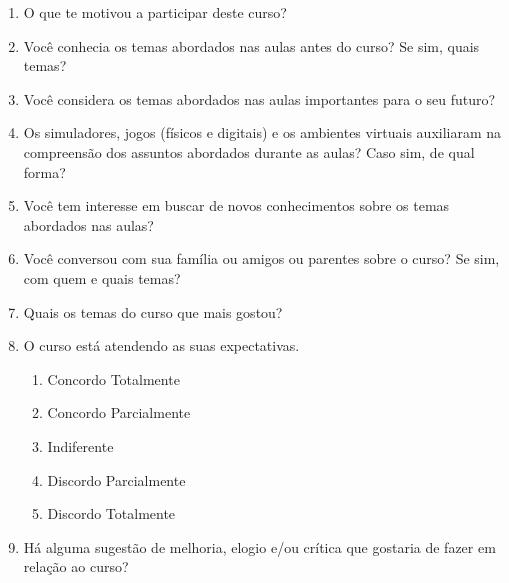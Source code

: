 \begin{enumerate}
    \item O que te motivou a participar deste curso?
    
    \item Você conhecia os temas abordados nas aulas antes do curso? Se sim, quais temas?
    
    \item Você considera os temas abordados nas aulas importantes para o seu futuro?
    
    \item Os simuladores, jogos (físicos e digitais) e os ambientes virtuais auxiliaram na compreensão dos assuntos abordados durante as aulas? Caso sim, de qual forma?
    
    \item Você tem interesse em buscar de novos conhecimentos sobre os temas abordados nas aulas?
    
    \item Você conversou com sua família ou amigos ou parentes sobre o curso? Se sim, com quem e quais temas?
    
    \item Quais os temas do curso que mais gostou?
    
    \item O curso está atendendo as suas expectativas.
        \begin{enumerate}
            \item Concordo Totalmente
            \item Concordo Parcialmente
            \item Indiferente
            \item Discordo Parcialmente
            \item Discordo Totalmente
        \end{enumerate}
    
    \item Há alguma sugestão de melhoria, elogio e/ou crítica que gostaria de fazer em relação ao curso?
\end{enumerate}
